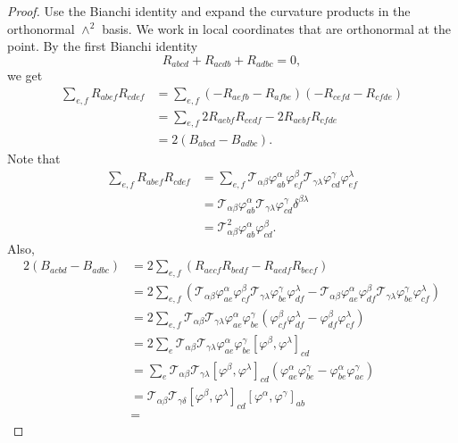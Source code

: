 \begin{proof}
\sketch Use the Bianchi identity and expand the curvature products in the
orthonormal $\wedge^2$ basis.
We work in local coordinates that are orthonormal at
the point. By the first Bianchi identity $$R_{abcd}+ R_{acdb}+
R_{adbc} = 0,$$ we get
\begin{align*}
\sum_{e,f}R_{abef}R_{cdef} &=
\sum_{e,f}(-R_{aefb}-R_{afbe})(-R_{cefd}-R_{cfde})\\& =
\sum_{e,f}2R_{aebf}R_{cedf}-2R_{aebf}R_{cfde}\\& = 2(B_{abcd} -
B_{adbc}).
\end{align*}
Note that
\begin{align*}
\sum_{e,f}R_{abef}R_{cdef}& =
\sum_{e,f}{\mathcal T}_{\alpha\beta}\varphi^{\alpha}_{ab}\varphi^{\beta}_{ef}
{\mathcal T}_{\gamma\lambda}\varphi^{\gamma}_{cd}\varphi^{\lambda}_{ef}\\
&={\mathcal T}_{\alpha\beta}\varphi^{\alpha}_{ab}{\mathcal
T}_{\gamma\lambda}\varphi^{\gamma}_{cd}\delta^{\beta\lambda}\\& =
{\mathcal
T}^{2}_{\alpha\beta}\varphi^{\alpha}_{ab}\varphi^{\beta}_{cd}.
\end{align*}
Also,
\begin{align*}
2(B_{acbd}-B_{adbc}) &= 2\sum_{e,f}(R_{aecf}R_{bedf} -
R_{aedf}R_{becf})\\& = 2\sum_{e,f}({\mathcal
T}_{\alpha\beta}\varphi^{\alpha}_{ae}\varphi^{\beta}_{cf}{\mathcal
T}_{\gamma\lambda}\varphi^{\gamma}_{be}\varphi^{\lambda}_{df} -
{\mathcal
T}_{\alpha\beta}\varphi^{\alpha}_{ae}\varphi^{\beta}_{df}{\mathcal
T}_{\gamma\lambda}\varphi^{\gamma}_{be}\varphi^{\lambda}_{cf})
\\&=
2\sum_{e,f}{\mathcal T}_{\alpha\beta}{\mathcal
T}_{\gamma\lambda}\varphi^{\alpha}_{ae}\varphi^{\gamma}_{be}(\varphi^{\beta}_{cf}\varphi^{\lambda}_{df}-\varphi^{\beta}_{df}\varphi^{\lambda}_{cf})
\\&=2\sum_e{\mathcal T}_{\alpha\beta}{\mathcal T}_{\gamma\lambda}\varphi^{\alpha}_{ae}
\varphi^{\gamma}_{be}[\varphi^{\beta},\varphi^{\lambda}]_{cd}
\\&=
\sum_e{\mathcal T}_{\alpha\beta}{\mathcal
T}_{\gamma\lambda}[\varphi^{\beta},\varphi^{\lambda}]_{cd}
(\varphi^{\alpha}_{ae}\varphi^{\gamma}_{be}
- \varphi^{\alpha}_{be}\varphi^{\gamma}_{ae})
\\&={\mathcal T}_{\alpha\beta}{\mathcal T}_{\gamma\delta}[\varphi^{\beta},\varphi^{\lambda}]_{cd}[\varphi^{\alpha},\varphi^{\gamma}]_{ab}
\\&=

\end{align*}
\end{proof}
